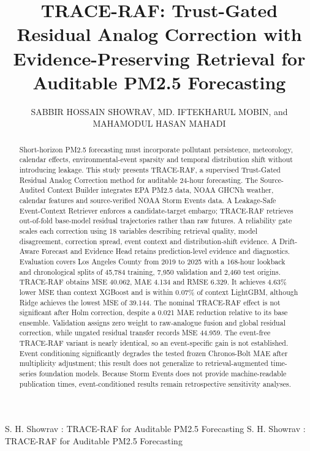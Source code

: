 \documentclass{ieeeaccess}
\begin{document}
\history{}
\doi{}

\title{TRACE-RAF: Trust-Gated Residual Analog Correction with Evidence-Preserving Retrieval for Auditable PM2.5 Forecasting}

\author{\uppercase{Sabbir Hossain Showrav},
\uppercase{Md. Iftekharul Mobin}, and
\uppercase{Mahamodul Hasan Mahadi}}

\address[1]{Department of Computer Science, Faculty of Science and Technology,
American International University-Bangladesh, Dhaka 1229, Bangladesh}

\markboth
{S. H. Showrav \headeretal: TRACE-RAF for Auditable PM2.5 Forecasting}
{S. H. Showrav \headeretal: TRACE-RAF for Auditable PM2.5 Forecasting}


\begin{abstract}
Short-horizon PM2.5 forecasting must incorporate pollutant persistence, meteorology, calendar effects, environmental-event sparsity and temporal distribution shift without introducing leakage. This study presents TRACE-RAF, a supervised Trust-Gated Residual Analog Correction method for auditable 24-hour forecasting. The Source-Audited Context Builder integrates EPA PM2.5 data, NOAA GHCNh weather, calendar features and source-verified NOAA Storm Events data. A Leakage-Safe Event-Context Retriever enforces a candidate-target embargo; TRACE-RAF retrieves out-of-fold base-model residual trajectories rather than raw futures. A reliability gate scales each correction using 18 variables describing retrieval quality, model disagreement, correction spread, event context and distribution-shift evidence. A Drift-Aware Forecast and Evidence Head retains prediction-level evidence and diagnostics. Evaluation covers Los Angeles County from 2019 to 2025 with a 168-hour lookback and chronological splits of 45,784 training, 7,950 validation and 2,460 test origins. TRACE-RAF obtains MSE 40.062, MAE 4.134 and RMSE 6.329. It achieves 4.63\% lower MSE than context XGBoost and is within 0.07\% of context LightGBM, although Ridge achieves the lowest MSE of 39.144. The nominal TRACE-RAF effect is not significant after Holm correction, despite a 0.021 MAE reduction relative to its base ensemble. Validation assigns zero weight to raw-analogue fusion and global residual correction, while ungated residual transfer records MSE 44.959. The event-free TRACE-RAF variant is nearly identical, so an event-specific gain is not established. Event conditioning significantly degrades the tested frozen Chronos-Bolt MAE after multiplicity adjustment; this result does not generalize to retrieval-augmented time-series foundation models. Because Storm Events does not provide machine-readable publication times, event-conditioned results remain retrospective sensitivity analyses.
\end{abstract}
\end{document}
